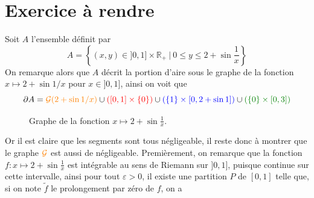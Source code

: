 \documentclass[10pt]{article}
\begin{document}
	

\section*{Exercice à rendre}
Soit $A$ l'ensemble définit par
\[
A = \left \{ (x,y) \in ]0,1] \times \mathbb R_+ ~|~ 0 \leqslant y \leqslant 2 + \sin \frac1x \right\}
\]
On remarque alors que $A$ décrit la portion d'aire sous le graphe de la fonction $x \mapsto 2 + \sin 1/x$ pour $x \in ]0,1]$, ainsi on voit que
\[
\partial A = {\color{orange} \mathcal G (2 + \sin 1/x)} \cup {\color{red}\left([0,1] \times \{0\} \right)}\cup {\color{blue}\left( \{1\}\times[0,2 +\sin1]\right)} \cup {\color{green!50!black}(\{0\}\times [0,3])}
\]
\begin{figure}[H]
\begin{center}
\caption{Graphe de la fonction $x \mapsto 2 + \sin \frac1x$.}
\end{center}
\end{figure}
Or il est claire que les segments sont tous négligeable, il reste donc à montrer que le graphe ${\color{orange} \mathcal G}$ est aussi de négligeable. Premièrement, on remarque que la fonction $f : x \mapsto 2 + \sin \frac1x$ est intégrable au sens de Riemann sur $]0,1]$, puisque continue sur cette intervalle, ainsi pour tout $\varepsilon > 0$, il existe une partition $P$ de $[0,1]$ telle que, si on note $\tilde f$ le prolongement par zéro de $f$, on a
\end{document}
